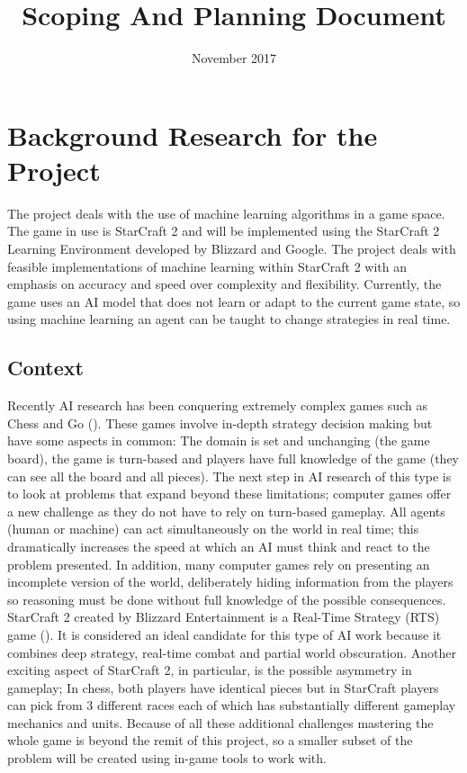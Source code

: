 \documentclass[12pt]{article}
\title{Scoping And Planning Document}
\date{November 2017}
\begin{document}


\maketitle

\section{Background Research for the Project}

The project deals with the use of machine learning algorithms in a game space.
The game in use is StarCraft 2 and will be implemented using the StarCraft 2
Learning Environment developed by Blizzard and Google.
The project deals with feasible implementations of machine learning within
StarCraft 2 with an emphasis on accuracy and speed over complexity and
flexibility. Currently, the game uses an AI model that does not learn
or adapt to the current game state, so using machine learning an agent can be
taught to change strategies in real time.

\subsection{Context}
Recently AI research has been conquering extremely complex games such as
Chess and Go (\cite{deepmind}). These games involve in-depth strategy decision
making but have some aspects in common: The domain is set and unchanging
(the game board), the game is turn-based and players have full knowledge of
the game (they can see all the board and all pieces).
The next step in AI research of this type is to look at problems that expand
beyond these limitations; computer games offer a new challenge as they
do not have to rely on turn-based gameplay. All agents (human or machine)
can act simultaneously on the world in real time; this dramatically increases
the speed at which an AI must think and react to the problem presented.
In addition, many computer games rely on presenting an incomplete version
of the world, deliberately hiding information from the players so reasoning
must be done without full knowledge of the possible consequences.
StarCraft 2 created by Blizzard Entertainment is a Real-Time Strategy (RTS)
game (\cite{starcraft2}). It is considered an ideal candidate for this type of
AI work because it combines deep strategy, real-time combat and partial
world obscuration. Another exciting aspect of StarCraft 2, in particular,
is the possible asymmetry in gameplay; In chess, both players have
identical pieces but in StarCraft players can pick from 3 different
races each of which has substantially different gameplay mechanics and units.
Because of all these additional challenges mastering the whole game is
beyond the remit of this project, so a smaller subset of the problem
will be created using in-game tools to work with.
\end{document}
